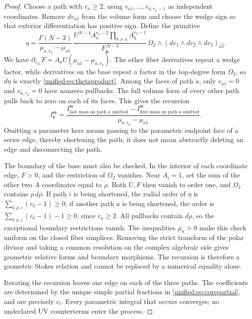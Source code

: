 \documentclass[11pt,a4paper,oneside]{article}
\theoremstyle{plain}
\theoremstyle{definition}
\theoremstyle{remark}
\numberwithin{equation}{section}
\begin{document}
\begin{proof}
Choose a path with $r_a\ge2$, using $v_{a1},\ldots,v_{a,r_a-1}$ as independent coordinates.
Remove $dv_{a1}$ from the volume form and choose the wedge sign so that exterior differentiation has positive sign. Define the primitive
\[
 \eta=
 \frac{\Gamma(N-3)}{\mu_{a,r_a}-\mu_{a1}}\,
 \frac{U^{N-4}A_a^{r_a-2}\prod_{b\ne a}A_b^{r_b-1}}
      {F_{\bar{\boldsymbol\mu}}^{\,N-3}}\,
 \Omega_2\wedge (dv_1\wedge dv_2\wedge dv_3)_{\widehat{a1}} .
\]
We have
$\partial_{v_{a1}}F=A_aU(\mu_{a1}-\mu_{a,r_a})$.
The other fiber derivatives repeat a wedge factor, while derivatives on the base repeat a factor in the top-degree form $\Omega_2$, so $d\eta$
is exactly \eqref{unified:eq:thetaproduct}.
Among the faces of path $a$, only $v_{a1}=0$ and $v_{a,r_a}=0$ have nonzero pullbacks.
The full volume form of every other path pulls back to zero on each of its faces.
This gives the recursion
\[
 I_{\mathbf r}^{\mathfrak m}
 =\frac{I_{\text{last mass on path $a$ omitted}}^{\mathfrak m}
          -I_{\text{first mass on path $a$ omitted}}^{\mathfrak m}}
        {\mu_{a,r_a}-\mu_{a1}} .
\]
Omitting a parameter here means passing to the parametric endpoint face of a series edge, thereby shortening the path; it does not mean abstractly deleting an edge and disconnecting the path.

The boundary of the base must also be checked. In the interior of each coordinate edge, $F>0$, and the restriction of $\Omega_2$ vanishes.
Near $A_i=1$, set the sum of the other two $A$ coordinates equal to $\rho$.
Both $U,F$ then vanish to order one, and $\Omega_2$ contains $\rho\,d\rho$.
If path $i$ is being shortened, the radial order of $\eta$ is
$\sum_{b\ne i}(r_b-1)\ge0$;
if another path $a$ is being shortened, the order is
$\sum_{b\ne i}(r_b-1)-1\ge0$, since $r_a\ge2$.
All pullbacks contain $d\rho$, so the exceptional boundary restrictions vanish.
The inequalities $\bar\mu_a>0$ make this check uniform on the closed fiber simplices.
Removing the strict transform of the polar divisor and taking a common resolution on the complex algebraic side gives geometric relative forms and boundary morphisms.
The recursion is therefore a geometric Stokes relation and cannot be replaced by a numerical equality alone.

Iterating the recursion leaves one edge on each of the three paths. The coefficients are determined by
the unique simple partial fractions in \eqref{unified:eq:corepartial}, and are precisely $c_t$.
Every parametric integral that occurs converges; no undeclared UV counterterms enter the process.
\end{proof}
\end{document}
